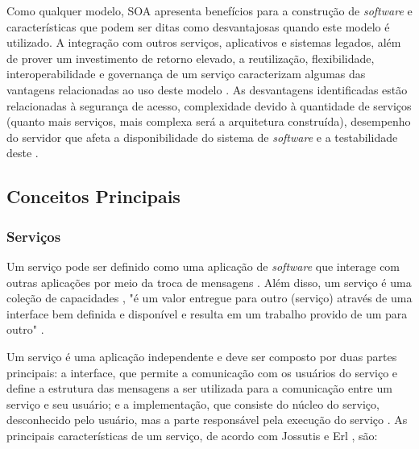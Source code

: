Como qualquer modelo, SOA apresenta benefícios para a construção de \textit{software} e características que podem ser ditas como desvantajosas quando este modelo é utilizado. A integração com outros serviços, aplicativos e sistemas legados, além de prover um investimento de retorno elevado, a reutilização, flexibilidade, interoperabilidade e governança de um serviço caracterizam algumas das vantagens relacionadas ao uso deste modelo \cite{oqueesoa_2010} \cite{vantagens_desvantagens_soa}. As desvantagens identificadas estão relacionadas à segurança de acesso, complexidade devido à quantidade de serviços (quanto mais serviços, mais complexa será a arquitetura construída), desempenho do servidor que afeta a disponibilidade do sistema de \textit{software} e a testabilidade deste \cite{oqueesoa_2010} \cite{vantagens_desvantagens_soa}.

\subsection{Conceitos Principais}
\subsubsection{Serviços}

Um serviço pode ser definido como uma aplicação de \textit{software} que interage com outras aplicações por meio da troca de mensagens \cite{linthicum_soainrealworld_2007}. Além disso, um serviço é uma coleção de capacidades \cite{erl_orientacaoaservico_2009}, "é um valor entregue para outro (serviço) através de uma interface bem definida e disponível e resulta em um trabalho provido de um para outro" \cite{adaptive_ltd_service_2009}.

Um serviço é uma aplicação independente e deve ser composto por duas partes principais: a interface, que permite a comunicação com os usuários do serviço e define a estrutura das mensagens a ser utilizada para a comunicação entre um serviço e seu usuário; e a implementação, que consiste do núcleo do serviço, desconhecido pelo usuário, mas a parte responsável pela execução do serviço \cite{linthicum_soainrealworld_2007}. As principais características de um serviço, de acordo com Jossutis \cite{josuttis_soa_2007} e Erl \cite{erl_orientacaoaservico_2009}, são:

